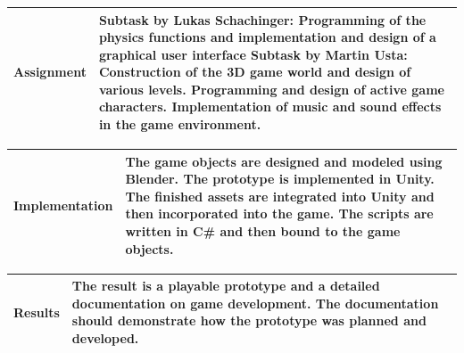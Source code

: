 \vspace{10pt}

\noindent
\begin{tabular}{|m{}|m{}|}
\hline
Assignment & Subtask by Lukas Schachinger: \newline \newline Programming of the physics functions and implementation and design of a graphical user interface \newline \newline Subtask by Martin Usta: \newline \newline Construction of the 3D game world and design of various levels. Programming and design of active game characters. Implementation of music and sound effects in the game environment.\\
\hline
\end{tabular}

\pagebreak

\noindent
\begin{tabular}{|m{}|m{}|}
\hline
Implementation & The game objects are designed and modeled using Blender. \newline \newline The prototype is implemented in Unity. The finished assets are integrated into Unity and then incorporated into the game. \newline \newline The scripts are written in C\# and then bound to the game objects. \\
\hline
\end{tabular}

\vspace{10pt}

\noindent
\begin{tabular}{|m{}|m{}|}
\hline
Results & The result is a playable prototype and a detailed documentation on game development. The documentation should demonstrate how the prototype was planned and developed.  \\
\hline
\end{tabular}

\pagebreak


